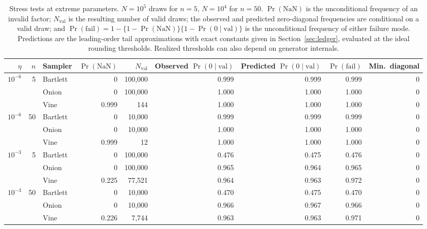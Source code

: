 \documentclass[12pt,english]{article}
\theoremstyle{plain} %
\theoremstyle{definition} %
\theoremstyle{remark} %
\newcommand{\xsec}[2]{Section~\ref{#1}}
\begin{document}
\begin{table}[t]
\centering
\caption{Stress tests at extreme parameters. $N=10^5$ draws for $n=5$, $N=10^4$ for $n=50$. $\Pr(\mathrm{NaN})$ is the unconditional frequency of an invalid factor; $N_{\mathrm{val}}$ is the resulting number of valid draws; the observed and predicted zero-diagonal frequencies are conditional on a valid draw; and $\Pr(\text{fail})=1-\{1-\Pr(\mathrm{NaN})\}\{1-\Pr(0\mid\text{val})\}$ is the unconditional frequency of either failure mode. Predictions are the leading-order tail approximations with exact constants given in \xsec{sec:ledger}{7}, evaluated at the ideal rounding thresholds. Realized thresholds can also depend on generator internals.}
\label{tab:stress}
\small
\begin{tabular}{rr l rrrrrr}
\toprule
$\eta$ & $n$ & Sampler & $\Pr(\mathrm{NaN})$ & $N_{\mathrm{val}}$ & \makecell{Observed\\$\Pr(0\mid\text{val})$} & \makecell{Predicted\\$\Pr(0\mid\text{val})$} & $\Pr(\text{fail})$ & Min.\ diagonal \\
\midrule
$10^{-6}$ &  5 & Bartlett & 0     & 100{,}000 & 0.999 & 0.999      & 0.999 & 0 \\
          &    & Onion    & 0     & 100{,}000 & 1.000 & 1.000      & 1.000 & 0 \\
          &    & Vine     & 0.999 & 144       & 1.000 & 1.000      & 1.000 & 0 \\
$10^{-6}$ & 50 & Bartlett & 0     & 10{,}000  & 0.999 & 0.999      & 0.999 & 0 \\
          &    & Onion    & 0     & 10{,}000  & 1.000 & 1.000      & 1.000 & 0 \\
          &    & Vine     & 0.999 & 12        & 1.000 & 1.000      & 1.000 & 0 \\
$10^{-3}$ &  5 & Bartlett & 0     & 100{,}000 & 0.476 & 0.475      & 0.476 & 0 \\
          &    & Onion    & 0     & 100{,}000 & 0.965 & 0.964      & 0.965 & 0 \\
          &    & Vine     & 0.225 & 77{,}521  & 0.964 & 0.963      & 0.972 & 0 \\
$10^{-3}$ & 50 & Bartlett & 0     & 10{,}000  & 0.470 & 0.475      & 0.470 & 0 \\
          &    & Onion    & 0     & 10{,}000  & 0.966 & 0.967      & 0.966 & 0 \\
          &    & Vine     & 0.226 & 7{,}744   & 0.963 & 0.963      & 0.971 & 0 \\

\end{tabular}
\end{table}
\end{document}
